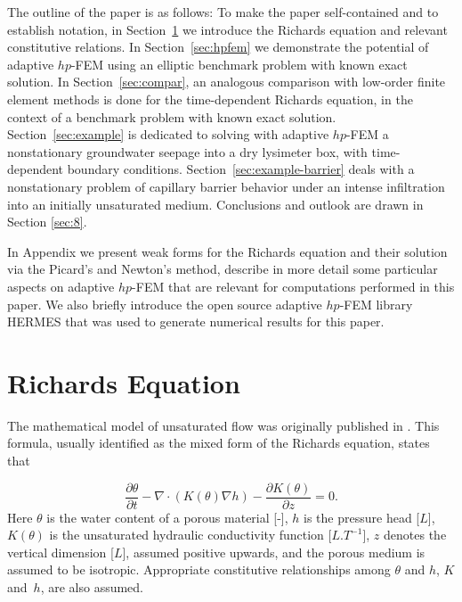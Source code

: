 \documentclass[final,3p,times,twocolumn]{elsarticle}
\begin{document}
The outline of the paper is as follows: To make the paper self-contained and to 
establish notation, in Section~\ref{sec:richards} we introduce the Richards equation and 
relevant constitutive relations. In Section~\ref{sec:hpfem} we
demonstrate the potential of adaptive $hp$-FEM using an elliptic benchmark problem with known 
exact solution. In Section~\ref{sec:compar}, an analogous comparison with low-order finite element 
methods is done for the time-dependent Richards equation, in the context of a 
benchmark problem with known exact solution. Section~\ref{sec:example} is dedicated to solving 
with adaptive $hp$-FEM a nonstationary groundwater seepage into a dry lysimeter box,
with time-dependent boundary conditions. Section~\ref{sec:example-barrier} deals with 
a nonstationary problem of capillary barrier behavior under an intense infiltration into 
an initially unsaturated medium. Conclusions and outlook are drawn in Section \ref{sec:8}.

In Appendix we present weak forms for the Richards equation and their solution 
via the Picard's and Newton's method, describe in more detail some particular aspects on adaptive 
$hp$-FEM that are relevant for computations performed in this paper. We also briefly 
introduce the open source adaptive $hp$-FEM library HERMES \cite{hermes} that was used to 
generate numerical results for this paper. 


\section{Richards Equation}
\label{sec:richards}


The mathematical model of  unsaturated flow was originally published in \cite{richards}. 
This formula, usually identified as the  mixed form of the Richards equation,  states that 

\begin{equation}
\label{mixed}
\frac{\partial \theta}{\partial t} - \nabla \cdot \left( K(\theta) \nabla h \right) - \frac{\partial K(\theta)}{\partial z} = 0.
\end{equation}
Here $\theta$ is the water content of a porous material [-], $h$ is the pressure head [$L$],  $K(\theta)$ is the unsaturated hydraulic conductivity function [$L.T^{-1}$],  $z$ denotes the 
vertical dimension [$L$], assumed positive upwards, and the porous medium is assumed to be isotropic. Appropriate  constitutive
relationships among $\theta$ and $h$, $K$ and~$h$, are also assumed.
\end{document}
